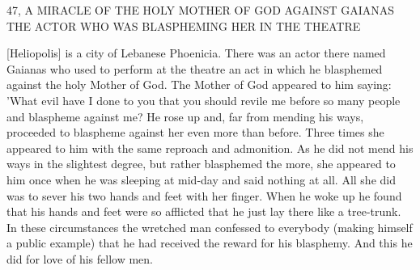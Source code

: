 47, A MIRACLE OF THE HOLY MOTHER OF GOD
AGAINST GAIANAS THE ACTOR WHO WAS
BLASPHEMING HER IN THE THEATRE

[Heliopolis] is a city of Lebanese Phoenicia. There was an actor
there named Gaianas who used to perform at the theatre an act in
which he blasphemed against the holy Mother of God. The Mother
of God appeared to him saying: 'What evil have I done to you that
you should revile me before so many people and blaspheme against
me? He rose up and, far from mending his ways, proceeded to
blaspheme against her even more than before. Three times she
appeared to him with the same reproach and admonition. As he did
not mend his ways in the slightest degree, but rather blasphemed the
more, she appeared to him once when he was sleeping at mid-day
and said nothing at all. All she did was to sever his two hands and
feet with her finger. When he woke up he found that his hands and
feet were so afflicted that he just lay there like a tree-trunk. In these
circumstances the wretched man confessed to everybody (making
himself a public example) that he had received the reward for his
blasphemy. And this he did for love of his fellow men.

